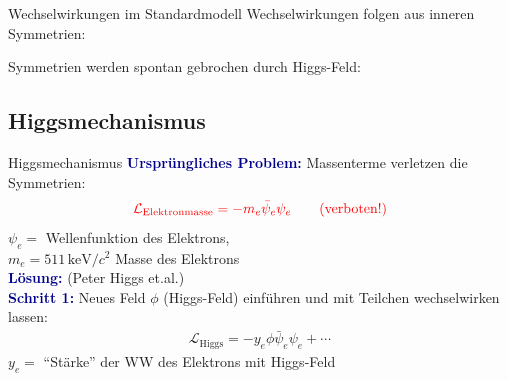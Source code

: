 \documentclass[hyperref={pdfpagelabels=false},ngerman]{beamer}
\newcommand{\Lagr}{\mathcal{L}}
\renewcommand{\emph}[1]{\textbf{\textcolor{darkblue}{#1}}}
\begin{document}
\begin{frame}{Wechselwirkungen im Standardmodell}
  Wechselwirkungen folgen aus inneren Symmetrien:
  \vspace*{-1em}
  \begin{center}
  \end{center}
  \vspace*{1em}
  Symmetrien werden spontan gebrochen durch Higgs-Feld:
  \begin{center}
  \end{center}
\end{frame}

\subsection{Higgsmechanismus}

\begin{frame}{Higgsmechanismus}
  \emph{Ursprüngliches Problem:} Massenterme verletzen die Symmetrien:
  \begin{align*}
    \textcolor{red}{\Lagr_{\text{Elektronmasse}} =
    - m_e \bar{\psi}_e \psi_e \qquad (\text{verboten!})}
  \end{align*}
  $\psi_e =$ Wellenfunktion des Elektrons,\\
  $m_e = 511\,\text{keV}/c^2$ Masse des Elektrons
  \\[1em]
  \pause
  \emph{Lösung:} (Peter Higgs et.al.)\\[0.5em]
  \emph{Schritt 1:}
  Neues Feld $\phi$ (Higgs-Feld) einführen und mit Teilchen
  wechselwirken lassen:
  \begin{align*}
    \Lagr_{\text{Higgs}} = - y_e \phi \bar{\psi}_e \psi_e + \cdots
  \end{align*}
  $y_e =$ ``Stärke'' der WW des Elektrons mit Higgs-Feld
\end{frame}
\end{document}
